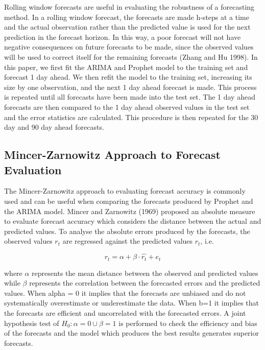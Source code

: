 \documentclass[12pt,a4paper]{article}
\numberwithin{equation}{section}
\numberwithin{figure}{section}
\numberwithin{table}{section}
\begin{document}
Rolling window forecasts are useful in evaluating the robustness of a
forecasting method. In a rolling window forecast, the forecasts are made
h-steps at a time and the actual observation rather than the predicted
value is used for the next prediction in the forecast horizon. In this
way, a poor forecast will not have negative consequences on future
forecasts to be made, since the observed values will be used to correct
itself for the remaining forecasts (Zhang and Hu 1998). In this paper,
we first fit the ARIMA and Prophet model to the training set and
forecast 1 day ahead. We then refit the model to the training set,
increasing its size by one observation, and the next 1 day ahead
forecast is made. This process is repeated until all forecasts have been
made into the test set. The 1 day ahead forecasts are then compared to
the 1 day ahead observed values in the test set and the error statistics
are calculated. This procedure is then repeated for the 30 day and 90
day ahead forecasts.

\subsection{Mincer-Zarnowitz Approach to Forecast
Evaluation}\label{mincer-zarnowitz-approach-to-forecast-evaluation}

The Mincer-Zarnowitz approach to evaluating forecast accuracy is
commonly used and can be useful when comparing the forecasts produced by
Prophet and the ARIMA model. Mincer and Zarnowitz (1969) proposed an
absolute measure to evaluate forecast accuracy which considers the
distance between the actual and predicted values. To analyse the
absolute errors produced by the forecasts, the observed values \(r_t\)
are regressed against the predicted values \(r_t\), i.e.

\[r_t = \alpha + \beta\cdot\hat{r_t} + e_t\]

where \(\alpha\) represents the mean distance between the observed and
predicted values while \(\beta\) represents the correlation between the
forecasted errors and the predicted values. When alpha = 0 it implies
that the forecasts are unbiased and do not systematically overestimate
or underestimate the data. When b=1 it implies that the forecasts are
efficient and uncorrelated with the forecasted errors. A joint
hypothesis test of \(H_0: \alpha = 0 \cup \beta = 1\) is performed to
check the efficiency and bias of the forecasts and the model which
produces the best results generates superior forecasts.
\end{document}
